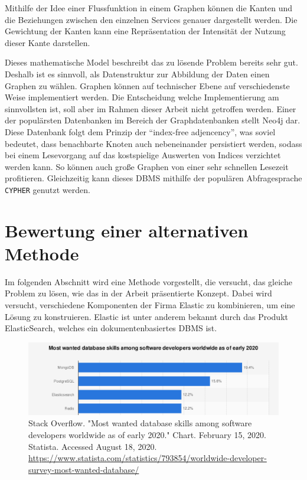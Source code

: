 Mithilfe der Idee einer Flussfunktion in einem Graphen können die Kanten und die Beziehungen zwischen den einzelnen Services genauer dargestellt werden. Die Gewichtung der Kanten kann eine Repräsentation der Intensität der Nutzung dieser Kante darstellen.

Dieses mathematische Model beschreibt das zu lösende Problem bereits sehr gut. Deshalb ist es sinnvoll, als Datenstruktur zur Abbildung der Daten einen Graphen zu wählen. Graphen können auf technischer Ebene auf verschiedenste Weise implementiert werden. Die Entscheidung welche Implementierung am sinnvollsten ist, soll aber im Rahmen dieser Arbeit nicht getroffen werden. Einer der populärsten Datenbanken im Bereich der Graphdatenbanken stellt Neo4j dar. Diese Datenbank folgt dem Prinzip der \enquote{index-free adjencency}, was soviel bedeutet, dass benachbarte Knoten auch nebeneinander persistiert werden, sodass bei einem Lesevorgang auf das kostspielige Auswerten von Indices verzichtet werden kann. So können auch große Graphen von einer sehr schnellen Lesezeit profitieren. Gleichzeitig kann dieses \ac{DBMS} mithilfe der populären Abfragesprache \texttt{CYPHER} genutzt werden.

\section{Bewertung einer alternativen Methode}

Im folgenden Abschnitt wird eine Methode vorgestellt, die versucht, das gleiche Problem zu lösen, wie das in der Arbeit präsentierte Konzept. Dabei wird versucht, verschiedene Komponenten der Firma Elastic zu kombinieren, um eine Lösung zu konstruieren. Elastic ist unter anderem bekannt durch das Produkt ElasticSearch, welches ein dokumentenbasiertes \ac{DBMS} ist.

\begin{figure}[h]
	\centering
	\includegraphics[width=1.0\linewidth]{img/statista_db.png}
	\caption[Übersicht Datenbanken]{Stack Overflow. "Most wanted database skills among software developers worldwide as of early 2020." Chart. February 15, 2020. Statista. Accessed August 18, 2020. \url{https://www.statista.com/statistics/793854/worldwide-developer-survey-most-wanted-database/}}
\end{figure}

